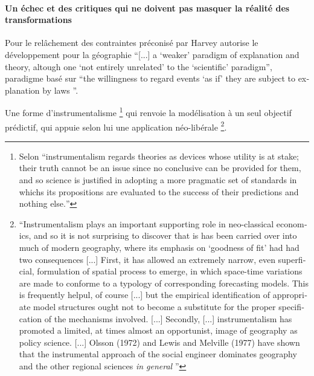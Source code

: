 \paragraph{Un échec et des critiques qui ne doivent pas masquer la réalité des transformations}


Pour \textcite[41]{Gregory1978} le relâchement des contraintes préconisé par Harvey \autocite[47]{Paterson1984} autorise le développement pour la géographie \foreignquote{english}{[...] a \enquote{weaker} paradigm of explanation and theory, altough one \enquote{not entirely unrelated} to the \enquote{scientific} paradigm}, paradigme basé sur \foreignquote{english}{the willingness to regard events \enquote{as if} they are subject to explanation by laws \autocite[174]{Harvey1969}}. 

Une forme d'instrumentalisme \footnote{Selon \textcite{Gregory1978} \foreignquote{english}{instrumentalism regards theories as devices whose utility is at stake; their truth cannot be an issue since no conclusive can be provided for them, and so science is justified in adopting a more pragmatic set of standards in whichs its propositions are evaluated to the success of their predictions and nothing else.}} qui renvoie la modélisation à un seul objectif prédictif, qui appuie selon lui une application néo-libérale \footnote{\foreignquote{english}{Instrumentalism plays an important supporting role in neo-classical economics, and so it is not surprising to discover that is has been carried over into much of modern geography, where its emphasis on \foreignquote{english}{goodness of fit} had had two consequences [...] First, it has allowed an extremely narrow, even superficial, formulation of spatial process to emerge, in which space-time variations are made to conforme to a typology of corresponding forecasting models. This is frequently helpul, of course [...] but the empirical identification of appropriate model structures ought not to become a substitute for the proper specification of the mechanisms involved. [...] Secondly, [...] instrumentalism has promoted a limited, at times almost an opportunist, image of geography as policy science. [...] Olsson (1972) and Lewis and Melville (1977) have shown that the instrumental approach of the social engineer dominates geography and the other regional sciences \textit{in general} \autocite[41]{Gregory1978}}}. 

